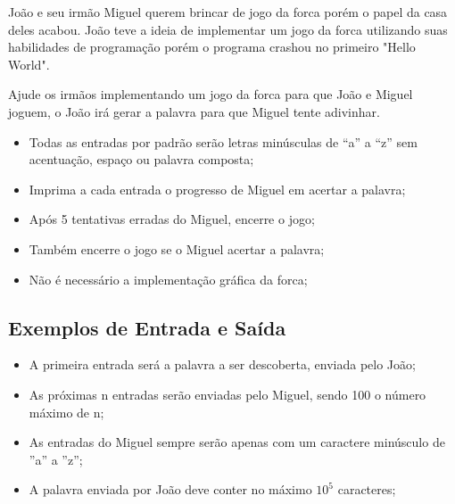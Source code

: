 João e seu irmão Miguel querem brincar de jogo da forca porém o papel da casa deles acabou. João teve a ideia de implementar um jogo da forca utilizando suas habilidades de programação porém o programa crashou no primeiro "Hello World". 

Ajude os irmãos implementando um jogo da forca para que João e Miguel joguem, o João irá gerar a palavra para que Miguel tente adivinhar.

\begin{itemize}

    \item Todas as entradas por padrão serão letras minúsculas de ``a'' a ``z'' sem acentuação, espaço ou palavra composta;

    \item Imprima a cada entrada o progresso de Miguel em acertar a palavra;
    
    \item Após 5 tentativas erradas do Miguel, encerre o jogo;
    
    \item Também encerre o jogo se o Miguel acertar a palavra;
    
    \item Não é necessário a implementação gráfica da forca;
    
\end{itemize}

\subsection*{Exemplos de Entrada e Saída}


\begin{itemize}

    \item A primeira entrada será a palavra a ser descoberta, enviada pelo João;

    \item As próximas n entradas serão enviadas pelo Miguel, sendo 100 o número máximo de n;
    
    \item As entradas do Miguel sempre serão apenas com um caractere minúsculo de ''a'' a ''z'';
    
    
    \item A palavra enviada por João deve conter no máximo $10^5$ caracteres;
    

\end{itemize}

